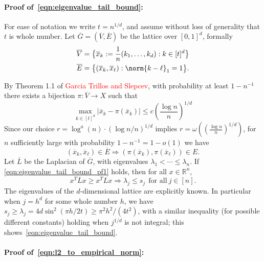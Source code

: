 \documentclass{article}
\newcommand{\Reals}{\mathbb{R}}
\newcommand{\abs}[1]{\left \lvert #1 \right \rvert}
\newcommand{\1}{\mathbf{1}}
\theoremstyle{alden}
\theoremstyle{aldenthm}
\theoremstyle{definition}
\theoremstyle{remark}
\begin{document}
\paragraph{Proof of~\eqref{eqn:eigenvalue_tail_bound}:}

For ease of notation we write $t = n^{1/d}$, and assume without loss of generality that $t$ is whole number. Let $\overline{G} = (\overline{V},\overline{E})$ be the lattice over $[0,1]^d$, formally
\begin{align*}
\overline{V} & = \bigl\{\overline{x}_k := \frac{1}{n}(k_1,\ldots,k_d): k \in [t]^d\bigr\} \\
\overline{E} & = \bigl\{(\overline{x}_k, \overline{x}_{\ell}): \norm{k - \ell}_1 = 1\bigr\}.
\end{align*}

By Theorem 1.1 of \textcolor{red}{Garcia Trillos and Slepcev}, with probability at least $1 - n^{-1}$ there exists a bijection $\pi: \overline{V} \to X$ such that
\begin{equation*}
\max_{k \in [t]^d} \abs{\overline{x}_k - \pi(\overline{x}_k)} \leq c \left(\frac{\log n}{n}\right)^{1/d}
\end{equation*}
Since our choice $r = \log^a(n) \cdot (\log n/n)^{1/d}$ implies $r = \omega(\left(\frac{\log n}{n}\right)^{1/d})$, for $n$ sufficiently large with probability $1 - n^{-1} = 1 - o(1)$ we have
\begin{equation}
\label{eqn:eigenvalue_tail_bound_pf1}
(\overline{x}_k,\overline{x}_{\ell}) \in \overline{E} \Longrightarrow (\pi(\overline{x}_k),\pi(\overline{x}_{\ell})) \in E.
\end{equation}
Let $\overline{L}$ be the Laplacian of $\overline{G}$, with eigenvalues $\lambda_1 < \cdots \leq \lambda_n$. If \eqref{eqn:eigenvalue_tail_bound_pf1} holds, then for all $x \in \Reals^n$,
\begin{equation*}
x^T \overline{L} x \geq x^T L x \Longrightarrow \lambda_j \leq s_j~~ \textrm{for all}~ j \in [n].
\end{equation*}
The eigenvalues of the $d$-dimensional lattice are explicitly known. In particular when $j = h^d$ for some whole number $h$, we have $s_j \geq \lambda_j = 4 d \sin^2(\pi h/2t) \geq \pi^2 h^2/ (4 t^2)$, with a similar inequality (for possible different constants) holding when $j^{1/d}$ is not integral; this shows~\eqref{eqn:eigenvalue_tail_bound}.


\paragraph{Proof of~\eqref{eqn:l2_to_empirical_norm}:}
\end{document}
